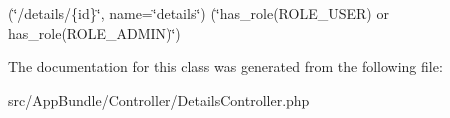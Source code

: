 (\char`\"{}/details/\{id\}\char`\"{}, name=\char`\"{}details\char`\"{}) (\char`\"{}has\+\_\+role(\textquotesingle{}\+R\+O\+L\+E\+\_\+\+U\+S\+E\+R\textquotesingle{}) or has\+\_\+role(\textquotesingle{}\+R\+O\+L\+E\+\_\+\+A\+D\+M\+I\+N\textquotesingle{})\char`\"{}) 

The documentation for this class was generated from the following file\+:\begin{DoxyCompactItemize}
\item 
src/\+App\+Bundle/\+Controller/Details\+Controller.\+php\end{DoxyCompactItemize}

